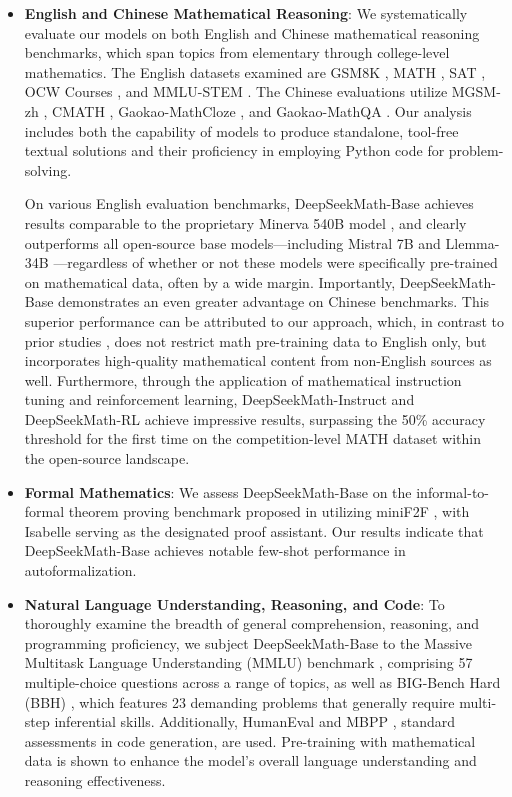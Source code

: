 \begin{itemize}[topsep=0pt]
    \item \textbf{English and Chinese Mathematical Reasoning}: We systematically evaluate our models on both English and Chinese mathematical reasoning benchmarks, which span topics from elementary through college-level mathematics. The English datasets examined are GSM8K \citep{gsm8k}, MATH \citep{MATH}, SAT \citep{llemma}, OCW Courses \citep{minerva}, and MMLU-STEM \citep{mmlu}. The Chinese evaluations utilize MGSM-zh \citep{mgsm}, CMATH \citep{wei2023cmath}, Gaokao-MathCloze \citep{agieval}, and Gaokao-MathQA \citep{agieval}. Our analysis includes both the capability of models to produce standalone, tool-free textual solutions and their proficiency in employing Python code for problem-solving.

On various English evaluation benchmarks, DeepSeekMath-Base achieves results comparable to the proprietary Minerva 540B model \citep{minerva}, and clearly outperforms all open-source base models—including Mistral 7B \citep{mistral} and Llemma-34B \citep{llemma}—regardless of whether or not these models were specifically pre-trained on mathematical data, often by a wide margin. Importantly, DeepSeekMath-Base demonstrates an even greater advantage on Chinese benchmarks. This superior performance can be attributed to our approach, which, in contrast to prior studies \citep{minerva,llemma}, does not restrict math pre-training data to English only, but incorporates high-quality mathematical content from non-English sources as well. Furthermore, through the application of mathematical instruction tuning and reinforcement learning, DeepSeekMath-Instruct and DeepSeekMath-RL achieve impressive results, surpassing the 50\% accuracy threshold for the first time on the competition-level MATH dataset within the open-source landscape.

\item \textbf{Formal Mathematics}: We assess DeepSeekMath-Base on the informal-to-formal theorem proving benchmark proposed in \citep{dsp_proof} utilizing miniF2F \citep{minif2f}, with Isabelle \citep{isabelle} serving as the designated proof assistant. Our results indicate that DeepSeekMath-Base achieves notable few-shot performance in autoformalization.
\item \textbf{Natural Language Understanding, Reasoning, and Code}: To thoroughly examine the breadth of general comprehension, reasoning, and programming proficiency, we subject DeepSeekMath-Base to the Massive Multitask Language Understanding (MMLU) benchmark \citep{mmlu}, comprising 57 multiple-choice questions across a range of topics, as well as BIG-Bench Hard (BBH) \citep{bbh}, which features 23 demanding problems that generally require multi-step inferential skills. Additionally, HumanEval \citep{codex} and MBPP \citep{mbpp}, standard assessments in code generation, are used. Pre-training with mathematical data is shown to enhance the model's overall language understanding and reasoning effectiveness.


\end{itemize}
